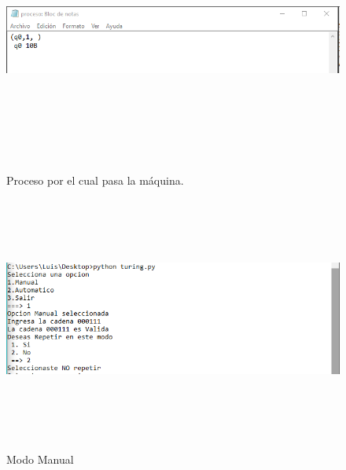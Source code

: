 \documentclass[12pt]{article}
\begin{document}
\begin{figure}[H]
\begin{center}
\includegraphics[width=\textwidth, height=8cm]{auto_turing_proceso}
\label{ }
\caption{Proceso por el cual pasa la máquina. }
\end{center}
\end{figure}

\begin{figure}[H]
\begin{center}
\includegraphics[width=\textwidth, height=8cm]{manual_turing}
\label{ }
\caption{Modo Manual}
\end{center}
\end{figure}
\end{document}
